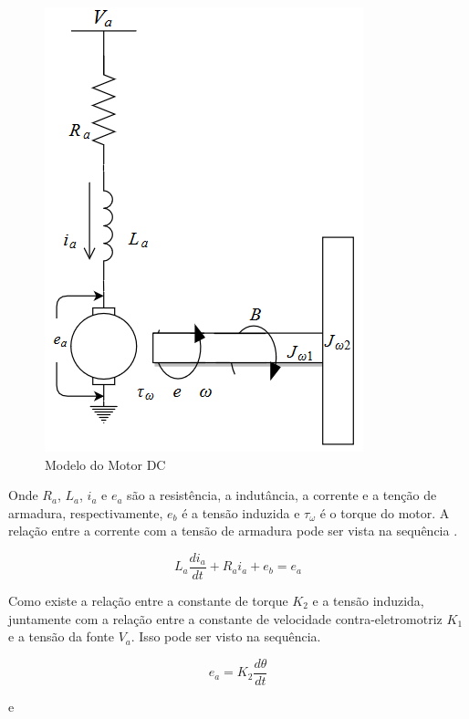 \begin{figure}[H]
  \caption{Modelo do Motor DC}
  \begin{center}
      \includegraphics[scale=.7]{metodologia/img/modelo_motor_dc}
  \end{center}
  \label{fig:modelo_motor_dc}
\end{figure}

Onde $R_a$, $L_a$, $i_a$ e $e_a$ são a resistência, a indutância, a corrente e a tenção de armadura, respectivamente, $e_b$ é a tensão induzida e $\tau_{\omega}$ é o torque do motor. A relação entre a corrente com a tensão de armadura pode ser vista na sequência \cite{Ogata}.

\begin{equation}
L_a \frac{di_a}{dt}+R_a i_a + e_b = e_a
\end{equation}

Como existe a relação entre a constante de torque $K_2$ e a tensão induzida, juntamente com a relação entre a constante de velocidade contra-eletromotriz $K_1$ e a tensão da fonte $V_a$. Isso pode ser visto na sequência.

\begin{equation}
  e_a = K_2\frac{d\theta}{dt}
\end{equation}

e

